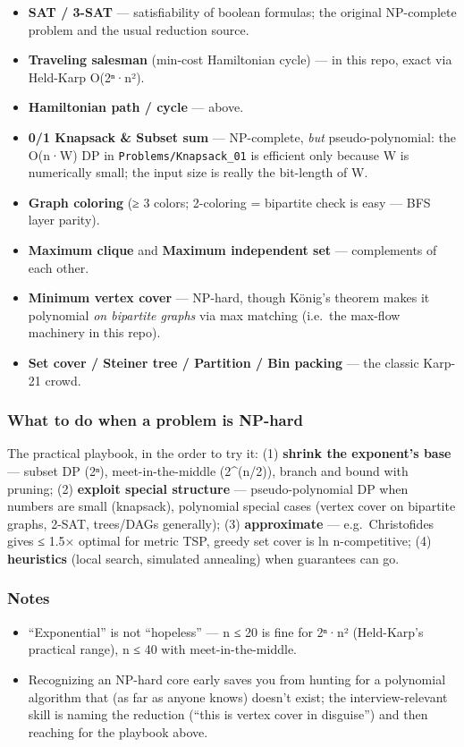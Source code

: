\documentclass[
  10pt,
  letterpaper,
  onecolumn]{article}
\providecommand{\tightlist}{%
  \setlength{\itemsep}{0pt}\setlength{\parskip}{0pt}}
\begin{document}
\begin{itemize}
\tightlist
\item
  \textbf{SAT / 3-SAT} --- satisfiability of boolean formulas; the
  original NP-complete problem and the usual reduction source.
\item
  \textbf{Traveling salesman} (min-cost Hamiltonian cycle) --- in this
  repo, exact via Held-Karp O(2ⁿ·n²).
\item
  \textbf{Hamiltonian path / cycle} --- above.
\item
  \textbf{0/1 Knapsack \& Subset sum} --- NP-complete, \emph{but}
  pseudo-polynomial: the O(n·W) DP in \texttt{Problems/Knapsack\_01} is
  efficient only because W is numerically small; the input size is
  really the bit-length of W.
\item
  \textbf{Graph coloring} (≥ 3 colors; 2-coloring = bipartite check is
  easy --- BFS layer parity).
\item
  \textbf{Maximum clique} and \textbf{Maximum independent set} ---
  complements of each other.
\item
  \textbf{Minimum vertex cover} --- NP-hard, though König's theorem
  makes it polynomial \emph{on bipartite graphs} via max matching
  (i.e.~the max-flow machinery in this repo).
\item
  \textbf{Set cover / Steiner tree / Partition / Bin packing} --- the
  classic Karp-21 crowd.
\end{itemize}

\hypertarget{what-to-do-when-a-problem-is-np-hard}{%
\subsubsection{What to do when a problem is
NP-hard}\label{what-to-do-when-a-problem-is-np-hard}}

The practical playbook, in the order to try it: (1) \textbf{shrink the
exponent's base} --- subset DP (2ⁿ), meet-in-the-middle (2\^{}(n/2)),
branch and bound with pruning; (2) \textbf{exploit special structure}
--- pseudo-polynomial DP when numbers are small (knapsack), polynomial
special cases (vertex cover on bipartite graphs, 2-SAT, trees/DAGs
generally); (3) \textbf{approximate} --- e.g.~Christofides gives ≤ 1.5×
optimal for metric TSP, greedy set cover is ln n-competitive; (4)
\textbf{heuristics} (local search, simulated annealing) when guarantees
can go.

\hypertarget{notes-27}{%
\subsubsection{Notes}\label{notes-27}}

\begin{itemize}
\tightlist
\item
  ``Exponential'' is not ``hopeless'' --- n ≤ 20 is fine for 2ⁿ·n²
  (Held-Karp's practical range), n ≤ 40 with meet-in-the-middle.
\item
  Recognizing an NP-hard core early saves you from hunting for a
  polynomial algorithm that (as far as anyone knows) doesn't exist; the
  interview-relevant skill is naming the reduction (``this is vertex
  cover in disguise'') and then reaching for the playbook above.
\end{itemize}
\end{document}
